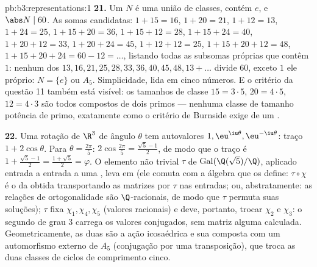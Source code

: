 \begin{solution}{pb:b3:representations:1}
\textbf{21.} Um  $N$ é uma união de classes,
contém $e$, e $\abs N \mid 60$. As somas candidatas:
$1{+}15 = 16$, $1{+}20 = 21$, $1{+}12 = 13$, $1{+}24 = 25$,
$1{+}15{+}20 = 36$, $1{+}15{+}12 = 28$, $1{+}15{+}24 = 40$,
$1{+}20{+}12 = 33$, $1{+}20{+}24 = 45$, $1{+}12{+}12 = 25$,
$1{+}15{+}20{+}12 = 48$, $1{+}15{+}20{+}24 = 60 - 12 = \dots$,
listando todas as subsomas próprias que contêm $1$: nenhum dos $13, 16,
21, 25, 28, 33, 36, 40, 45, 48, 13{+}\dots$ divide $60$,
exceto $1$ ele próprio: $N = \{e\}$ ou $A_5$. Simplicidade, lida em
cinco números. E o critério da questão 11 também está visível: os
tamanhos de classe $15 = 3\cdot5$, $20 = 4\cdot5$, $12 = 4\cdot3$ são
todos compostos de dois primos --- nenhuma classe de tamanho potência de
primo, exatamente como o critério de Burnside exige de um .

\textbf{22.} Uma rotação de $\R^3$ de ângulo $\theta$ tem
autovalores $1, \eu^{\iu\theta}, \eu^{-\iu\theta}$: traço $1 +
2\cos\theta$. Para $\theta = \frac{2\pi}5$: $2\cos\frac{2\pi}5
= \frac{\sqrt5 - 1}2$, de modo que o traço é $1 + \frac{\sqrt5-1}2 =
\frac{1+\sqrt5}2 = \varphi$. O elemento não trivial $\tau$ de
$\operatorname{Gal}(\Q(\sqrt5)/\Q)$, aplicado entrada a entrada a uma
, leva  em  (ele comuta
com a álgebra que os define: $\tau\circ\chi$ é o  da
 obtida transportando as matrizes por
$\tau$ nas entradas; ou, abstratamente: as relações de ortogonalidade
são $\Q$-racionais, de modo que $\tau$ permuta suas soluções);
$\tau$ fixa $\chi_1, \chi_4, \chi_5$ (valores racionais) e
deve, portanto, trocar $\chi_2$ e $\chi_3$: o segundo
 de grau $3$ carrega os valores conjugados, sem matriz
alguma calculada. Geometricamente, as duas  são a
ação icosaédrica e sua composta com um automorfismo externo
de $A_5$ (conjugação por uma transposição), que
troca as duas classes de ciclos de comprimento cinco.


\end{solution}
